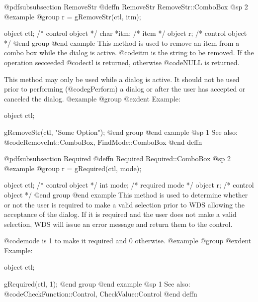 @pdfsubsubsection {RemoveStr}
@deffn {RemoveStr} RemoveStr::ComboBox
@sp 2
@example
@group
r = gRemoveStr(ctl, itm);

object  ctl;    /*  control object  */
char   *itm;    /*  item            */
object  r;      /*  control object  */
@end group
@end example
This method is used to remove an item from a combo box while the dialog
is active.  @code{itm} is the string to be removed.
If the operation secceeded @code{ctl} is returned, otherwise @code{NULL}
is returned.

This method may only be used while a dialog is active.  It should not be
used prior to performing (@code{gPerform}) a dialog or after the user
has accepted or canceled the dialog.
@example
@group
@exdent Example:

object  ctl;

gRemoveStr(ctl, "Some Option");
@end group
@end example
@sp 1
See also:  @code{RemoveInt::ComboBox, FindMode::ComboBox}
@end deffn

















@pdfsubsubsection {Required}
@deffn {Required} Required::ComboBox
@sp 2
@example
@group
r = gRequired(ctl, mode);

object  ctl;    /*  control object  */
int     mode;   /*  required mode   */
object  r;      /*  control object  */
@end group
@end example
This method is used to determine whether or not the user is required to
make a valid selection prior to WDS allowing the acceptance of the dialog.
If it is required and the user does not make a valid selection, WDS
will issue an error message and return them to the control.

@code{mode} is 1 to make it required and 0 otherwise.
@example
@group
@exdent Example:

object  ctl;

gRequired(ctl, 1);
@end group
@end example
@sp 1
See also:  @code{CheckFunction::Control, CheckValue::Control}
@end deffn



















